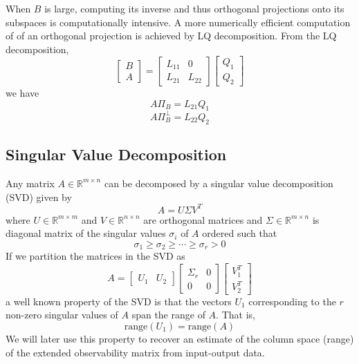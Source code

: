 When $B$ is large, computing its inverse and thus orthogonal projections onto its subspaces is computationally intensive. A more numerically efficient computation of of an orthogonal projection is achieved by LQ decomposition. From the LQ decomposition,
\begin{equation*}
\begin{bmatrix}B\\A\end{bmatrix} = 
\begin{bmatrix}L_{11} & 0\\ L_{21} & L_{22}\end{bmatrix}
\begin{bmatrix}Q_1\\ Q_2\end{bmatrix}
\end{equation*}
we have
\begin{equation*}
A\Pi_B = L_{21}Q_1
\end{equation*}
\begin{equation*}
A\Pi_B^\perp = L_{22}Q_2
\end{equation*}

\subsection{Singular Value Decomposition}
Any matrix $A \in \mathbb{R}^{m\times n}$ can be decomposed by a singular value decomposition (SVD) given by
\begin{equation*}
A = U\Sigma V^T
\end{equation*}
where $U \in \mathbb{R}^{m\times m}$ and $V \in \mathbb{R}^{n\times n}$ are orthogonal matrices and $\Sigma \in \mathbb{R}^{m\times n}$ is diagonal matrix of the singular values $\sigma_i$ of $A$ ordered such that
\begin{equation*}
\sigma_1 \geq \sigma_2 \geq \cdots \geq \sigma_r > 0
\end{equation*}
If we partition the matrices in the SVD as
\begin{equation*}
A = \left[\begin{array}{c|c}
U_1 & U_2
\end{array}\right]
\left[\begin{array}{c|c}
\Sigma_r & 0 \\ \hline 0 & 0
\end{array}\right]
\left[\begin{array}{c}
V_1^T \\ \hline V_2^T
\end{array}\right]
\end{equation*}
a well known property of the SVD is that the vectors $U_1$ corresponding to the $r$ non-zero singular values of $A$ span the range of $A$. That is,
\begin{equation*}
\mbox{range}(U_1) = \mbox{range}(A)
\end{equation*}
We will later use this property to recover an estimate of the column space (range) of the extended observability matrix from input-output data.

